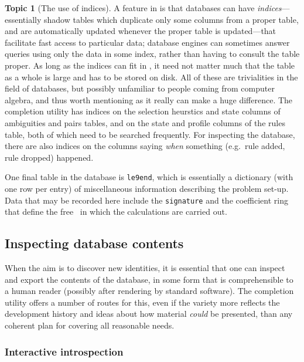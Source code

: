 \documentclass{article}
\theoremstyle{definition}
\newtheorem{topic}{Topic}
\newcommand{\PROP}{\smaller{PROP}}
\begin{document}
\begin{topic}[The use of  indices]
  A feature in  is that databases can have 
  \emph{indices}---essentially shadow tables which duplicate only 
  some columns from a proper table, and are automatically updated 
  whenever the proper table is updated---that facilitate fast access 
  to particular data; database engines can sometimes answer queries 
  using only the data in some index, rather than having to consult 
  the table proper. As long as the indices can fit in , 
  it need 
  not matter much that the table as a whole is large and has to be 
  stored on disk. All of these are trivialities in the field of 
  databases, but possibly unfamiliar to people coming from computer 
  algebra, and thus worth mentioning as it really can make a huge 
  difference. The completion utility has indices on the selection 
  heurstics and state columns of ambiguities and pairs tables, and 
  on the state and profile columns of the rules table, both of which 
  need to be searched frequently. For inspecting the database, there 
  are also indices on the columns saying \emph{when} something 
  (e.g.~rule added, rule dropped) happened.
\end{topic}


One final table in the database is \texttt{le9end}, which is 
essentially a dictionary (with one row per entry) of miscellaneous 
information describing the problem set-up. Data that may be recorded 
here include the \texttt{signature} and the coefficient ring that 
define the free \PROP\ in which the calculations are carried out.




\subsection{Inspecting database contents}
\label{Ssec:Introspection}

When the aim is to discover new identities, it is essential that one 
can inspect and export the contents of the database, in some form 
that is comprehensible to a human reader (possibly after rendering by 
standard software). The completion utility offers a number of routes 
for this, even if the variety more reflects the development history 
and ideas about how material \emph{could} be presented, than any 
coherent plan for covering all reasonable needs.


\subsubsection{Interactive introspection}
\end{document}
